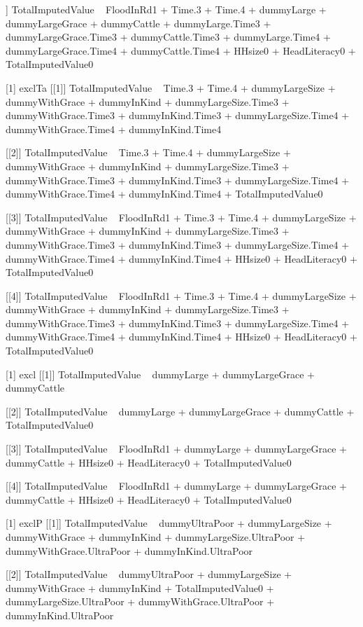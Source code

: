\begin{Schunk}
\begin{Soutput}
[[4]]
TotalImputedValue ~ FloodInRd1 + Time.3 + Time.4 + dummyLarge + 
    dummyLargeGrace + dummyCattle + dummyLarge.Time3 + dummyLargeGrace.Time3 + 
    dummyCattle.Time3 + dummyLarge.Time4 + dummyLargeGrace.Time4 + 
    dummyCattle.Time4 + HHsize0 + HeadLiteracy0 + TotalImputedValue0

[1] exclTa
[[1]]
TotalImputedValue ~ Time.3 + Time.4 + dummyLargeSize + dummyWithGrace + 
    dummyInKind + dummyLargeSize.Time3 + dummyWithGrace.Time3 + 
    dummyInKind.Time3 + dummyLargeSize.Time4 + dummyWithGrace.Time4 + 
    dummyInKind.Time4

[[2]]
TotalImputedValue ~ Time.3 + Time.4 + dummyLargeSize + dummyWithGrace + 
    dummyInKind + dummyLargeSize.Time3 + dummyWithGrace.Time3 + 
    dummyInKind.Time3 + dummyLargeSize.Time4 + dummyWithGrace.Time4 + 
    dummyInKind.Time4 + TotalImputedValue0

[[3]]
TotalImputedValue ~ FloodInRd1 + Time.3 + Time.4 + dummyLargeSize + 
    dummyWithGrace + dummyInKind + dummyLargeSize.Time3 + dummyWithGrace.Time3 + 
    dummyInKind.Time3 + dummyLargeSize.Time4 + dummyWithGrace.Time4 + 
    dummyInKind.Time4 + HHsize0 + HeadLiteracy0 + TotalImputedValue0

[[4]]
TotalImputedValue ~ FloodInRd1 + Time.3 + Time.4 + dummyLargeSize + 
    dummyWithGrace + dummyInKind + dummyLargeSize.Time3 + dummyWithGrace.Time3 + 
    dummyInKind.Time3 + dummyLargeSize.Time4 + dummyWithGrace.Time4 + 
    dummyInKind.Time4 + HHsize0 + HeadLiteracy0 + TotalImputedValue0

[1] excl
[[1]]
TotalImputedValue ~ dummyLarge + dummyLargeGrace + dummyCattle

[[2]]
TotalImputedValue ~ dummyLarge + dummyLargeGrace + dummyCattle + 
    TotalImputedValue0

[[3]]
TotalImputedValue ~ FloodInRd1 + dummyLarge + dummyLargeGrace + 
    dummyCattle + HHsize0 + HeadLiteracy0 + TotalImputedValue0

[[4]]
TotalImputedValue ~ FloodInRd1 + dummyLarge + dummyLargeGrace + 
    dummyCattle + HHsize0 + HeadLiteracy0 + TotalImputedValue0

[1] exclP
[[1]]
TotalImputedValue ~ dummyUltraPoor + dummyLargeSize + dummyWithGrace + 
    dummyInKind + dummyLargeSize.UltraPoor + dummyWithGrace.UltraPoor + 
    dummyInKind.UltraPoor

[[2]]
TotalImputedValue ~ dummyUltraPoor + dummyLargeSize + dummyWithGrace + 
    dummyInKind + TotalImputedValue0 + dummyLargeSize.UltraPoor + 
    dummyWithGrace.UltraPoor + dummyInKind.UltraPoor


\end{Soutput}
\end{Schunk}
